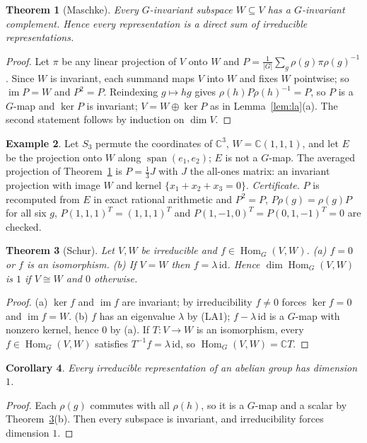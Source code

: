 \documentclass[11pt]{article}
\newtheorem{theorem}{Theorem}
\newtheorem{corollary}[theorem]{Corollary}
\theoremstyle{definition}
\newtheorem{example}[theorem]{Example}
\theoremstyle{remark}
\newcommand{\claim}[1]{\leavevmode\marginpar{\raggedright\scriptsize\texttt{#1}}}
\newcommand{\C}{\mathbb{C}}
\newcommand{\Hom}{\operatorname{Hom}}
\begin{document}
\begin{theorem}[Maschke]\label{thm:maschke}\claim{T-1}
Every $G$-invariant subspace $W\subseteq V$ has a $G$-invariant complement. Hence every representation is a direct sum of
irreducible representations.
\end{theorem}
\begin{proof}
Let $\pi$ be any linear projection of $V$ onto $W$ and $P=\frac1{|G|}\sum_g\rho(g)\pi\rho(g)^{-1}$. Since $W$ is invariant,
each summand maps $V$ into $W$ and fixes $W$ pointwise; so $\operatorname{im}P=W$ and $P^2=P$. Reindexing $g\mapsto hg$
gives $\rho(h)P\rho(h)^{-1}=P$, so $P$ is a $G$-map and $\ker P$ is invariant; $V=W\oplus\ker P$ as in
Lemma~\ref{lem:la}(a). The second statement follows by induction on $\dim V$.
\end{proof}

\begin{example}\label{ex:maschke}\claim{E-M}
Let $S_3$ permute the coordinates of $\C^3$, $W=\C(1,1,1)$, and let $E$ be the projection onto $W$ along
$\operatorname{span}(e_1,e_2)$; $E$ is not a $G$-map. The averaged projection of Theorem~\ref{thm:maschke} is
$P=\frac13J$ with $J$ the all-ones matrix: an invariant projection with image $W$ and kernel $\{x_1+x_2+x_3=0\}$.
\emph{Certificate.} $P$ is recomputed from $E$ in exact rational arithmetic and $P^2=P$, $P\rho(g)=\rho(g)P$ for all six $g$,
$P(1,1,1)^T=(1,1,1)^T$ and $P(1,-1,0)^T=P(0,1,-1)^T=0$ are checked.
\end{example}

\begin{theorem}[Schur]\label{thm:schur}\claim{T-2}
Let $V,W$ be irreducible and $f\in\Hom_G(V,W)$. (a) $f=0$ or $f$ is an isomorphism. (b) If $V=W$ then $f=\lambda\,\mathrm{id}$.
Hence $\dim\Hom_G(V,W)$ is $1$ if $V\cong W$ and $0$ otherwise.
\end{theorem}
\begin{proof}
(a) $\ker f$ and $\operatorname{im}f$ are invariant; by irreducibility $f\neq0$ forces $\ker f=0$ and $\operatorname{im}f=W$.
(b) $f$ has an eigenvalue $\lambda$ by (LA1); $f-\lambda\,\mathrm{id}$ is a $G$-map with nonzero kernel, hence $0$ by (a).
If $T\colon V\to W$ is an isomorphism, every $f\in\Hom_G(V,W)$ satisfies $T^{-1}f=\lambda\,\mathrm{id}$, so
$\Hom_G(V,W)=\C T$.
\end{proof}

\begin{corollary}\label{cor:abelian}\claim{C-1}
Every irreducible representation of an abelian group has dimension $1$.
\end{corollary}
\begin{proof}
Each $\rho(g)$ commutes with all $\rho(h)$, so it is a $G$-map and a scalar by Theorem~\ref{thm:schur}(b). Then every
subspace is invariant, and irreducibility forces dimension $1$.
\end{proof}
\end{document}
